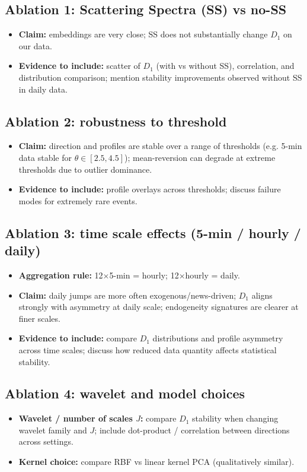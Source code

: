 \documentclass[11pt]{article}
\begin{document}
\subsection*{Ablation 1: Scattering Spectra (SS) vs no-SS}
\begin{itemize}
    \item \textbf{Claim:} embeddings are very close; SS does not substantially change $D_1$ on our data. 
    \item \textbf{Evidence to include:} scatter of $D_1$ (with vs without SS), correlation, and distribution comparison; mention stability improvements observed without SS in daily data. 
\end{itemize}

\subsection*{Ablation 2: robustness to threshold}
\begin{itemize}
    \item \textbf{Claim:} direction and profiles are stable over a range of thresholds (e.g. 5-min data stable for $\theta\in[2.5,4.5]$); mean-reversion can degrade at extreme thresholds due to outlier dominance. 
    \item \textbf{Evidence to include:} profile overlays across thresholds; discuss failure modes for extremely rare events. 
\end{itemize}

\subsection*{Ablation 3: time scale effects (5-min / hourly / daily)}
\begin{itemize}
    \item \textbf{Aggregation rule:} 12$\times$5-min = hourly; 12$\times$hourly = daily. 
    \item \textbf{Claim:} daily jumps are more often exogenous/news-driven; $D_1$ aligns strongly with asymmetry at daily scale; endogeneity signatures are clearer at finer scales. 
    \item \textbf{Evidence to include:} compare $D_1$ distributions and profile asymmetry across time scales; discuss how reduced data quantity affects statistical stability. 
\end{itemize}

\subsection*{Ablation 4: wavelet and model choices}
\begin{itemize}
    \item \textbf{Wavelet / number of scales $J$:} compare $D_1$ stability when changing wavelet family and $J$; include dot-product / correlation between directions across settings. 
    \item \textbf{Kernel choice:} compare RBF vs linear kernel PCA (qualitatively similar). 
\end{itemize}
\end{document}
